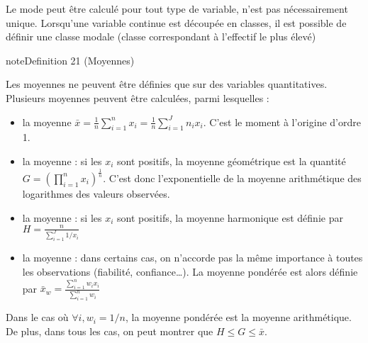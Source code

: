 \documentclass[letterpaper,10pt,french]{sphinxmanual}
\begin{document}
\sphinxAtStartPar
Le mode peut être calculé pour tout type de variable, n’est pas nécessairement unique. Lorsqu’une variable continue est découpée en classes, il est possible de définir une classe modale (classe correspondant à l’effectif le plus élevé)
\label{statsdescriptives:definition-5}
\begin{sphinxadmonition}{note}{Definition 21 (Moyennes)}



\sphinxAtStartPar
Les moyennes ne peuvent être définies que sur des variables quantitatives. Plusieurs moyennes peuvent être calculées, parmi lesquelles :
\begin{itemize}
\item {} 
\sphinxAtStartPar
la moyenne   \(\bar{x} = \frac{1}{n}{\displaystyle\sum_{i=1}^nx_i}=  \frac{1}{n}{\displaystyle\sum_{i=1}^J n_ix_i}\). C’est le moment à l’origine d’ordre 1.

\item {} 
\sphinxAtStartPar
la moyenne  : si les \(x_i\) sont positifs, la moyenne géométrique est la quantité \(G=\left (\displaystyle\prod_{i=1}^n x_i\right )^\frac{1}{n}\). C’est donc l’exponentielle de la moyenne arithmétique des logarithmes des valeurs observées.

\item {} 
\sphinxAtStartPar
la moyenne  : si les \(x_i\) sont positifs, la moyenne harmonique est définie par \(H=\frac{n}{\displaystyle\sum_{i=1}^J 1/x_i}\)

\item {} 
\sphinxAtStartPar
la moyenne  : dans certains cas, on n’accorde pas la même importance à toutes les observations (fiabilité, confiance…). La moyenne pondérée est alors définie par
\(\bar{x}_w= \frac{\displaystyle\sum_{i=1}^n w_ix_i}{\displaystyle\sum_{i=1}^n w_i}\)

\end{itemize}
\end{sphinxadmonition}

\sphinxAtStartPar
Dans le cas où \(\forall i,w_i=1/n\), la moyenne pondérée est la moyenne arithmétique. De plus, dans tous les cas, on peut montrer que \(H\leq G\leq \bar{x}\).
\end{document}
